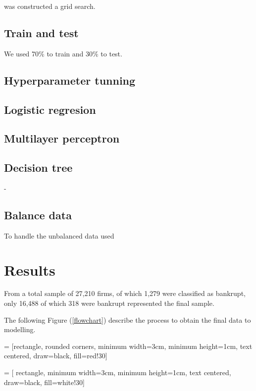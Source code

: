 \documentclass[journal]{IEEEtai}
\begin{document}
 was constructed a grid search.

\subsection{Train and test}

We used 70\% to train and 30\% to test.


\subsection{Hyperparameter tunning}

\subsection{Logistic regresion}


\subsection{Multilayer perceptron}


\subsection{Decision tree}
-
	

\subsection{Balance data}

To handle the unbalanced data used 


\section{Results}

From  a total sample of 27,210 firms, of which 1,279 were classified as bankrupt, only 16,488 of which 318 were bankrupt represented the final sample. 


The following Figure (\ref{flowchart}) describe the process to obtain the final data to modelling.


\usetikzlibrary{shapes.geometric, arrows}

 = [rectangle, rounded corners, 
minimum width=3cm, 
minimum height=1cm,
text centered, 
draw=black, 
fill=red!30]

 = [ rectangle, minimum width=3cm, 
minimum height=1cm, text centered, 
draw=black, fill=white!30]
\end{document}
